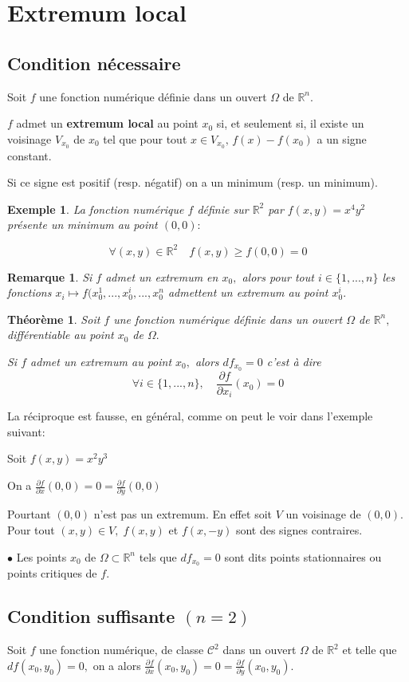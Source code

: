 \documentclass[11pt,a4paper]{report}
\newtheorem{theorem}{Théorème}[section]
\newtheorem{remarque}{Remarque}[section]
\newtheorem{ex}{Exemple}[section]
\begin{document}
\section{Extremum local}
\subsection{Condition nécessaire}
Soit $f$ une fonction numérique définie dans un ouvert $\Omega$ de $\mathbb{R}^n.$

$f$ admet un \textbf{extremum local} au point $x_0$ si, et seulement si, il existe un voisinage $V_{x_0}$ de $x_0$ tel que pour tout $x\in V_{x_0},\,f(x)-f(x_0)$ a un signe constant.

Si ce signe est positif (resp. négatif) on a un minimum (resp. un minimum).

\begin{ex}
La fonction numérique $f$ définie sur $\mathbb{R}^2$ par $f(x,y)=x^4 y^2$ présente un minimum au point $(0,0):$

$$\forall(x,y)\in \mathbb{R}^2\quad f(x,y)\geq f(0,0)=0$$
\end{ex}
\begin{remarque}
Si $f$ admet un extremum en $x_0,$ alors pour tout $i\in \{1,...,n\}$ les fonctions $x_i\mapsto f(x_{0}^{1},...,x_{0}^{i},...,x_{0}^{n}$ admettent un extremum au point $x_{0}^{i}.$
\end{remarque}
\begin{theorem}
Soit $f$ une fonction numérique définie dans un ouvert $\Omega$ de $\mathbb{R}^n,$ différentiable au point $x_0$ de $\Omega.$

Si $f$ admet un extremum au point $x_0,$ alors $df_{x_0}=0$ c'est à dire
$$\forall i\in\{1,...,n\},\quad\frac{\partial f}{\partial x_i}(x_0)=0$$
\end{theorem}
La réciproque est fausse, en général, comme on peut le voir dans l'exemple suivant:

Soit $f(x,y)=x^2 y^3$

On a $\frac{\partial f}{\partial x}(0,0)=0=\frac{\partial f}{\partial y}(0,0)$

Pourtant $(0,0)$ n'est pas un extremum. En effet soit $V$ un voisinage de $(0,0).$ Pour tout $(x,y)\in V,\;f(x,y)$ et $f(x,-y)$ sont des signes contraires.

$\bullet$ Les points $x_0$ de $\Omega\subset\mathbb{R}^n$ tels que $df_{x_0}=0$ sont dits points stationnaires ou points critiques de $f.$

\subsection{Condition suffisante $(n=2)$}
Soit $f$ une fonction numérique, de classe $\mathscr{C}^2$ dans un ouvert $\Omega$ de $\mathbb{R}^2$ et telle que $df(x_0,y_0)=0,$ on a alors $\frac{\partial f}{\partial x}(x_0,y_0)=0=\frac{\partial f}{\partial y}(x_0,y_0).$
\end{document}
